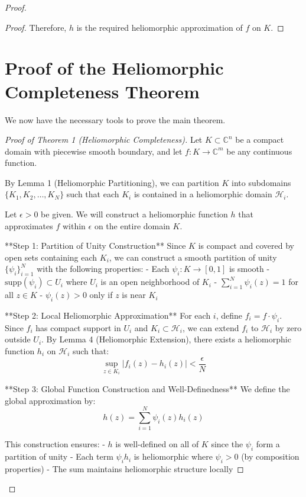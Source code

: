 \begin{proof}
\begin{proof}
Therefore, $h$ is the required heliomorphic approximation of $f$ on $K$.
\end{proof}

\section{Proof of the Heliomorphic Completeness Theorem}

We now have the necessary tools to prove the main theorem.

\begin{proof}[Proof of Theorem 1 (Heliomorphic Completeness)]
Let $K \subset \mathbb{C}^n$ be a compact domain with piecewise smooth boundary, and let $f: K \rightarrow \mathbb{C}^m$ be any continuous function.

By Lemma 1 (Heliomorphic Partitioning), we can partition $K$ into subdomains $\{K_1, K_2, \ldots, K_N\}$ such that each $K_i$ is contained in a heliomorphic domain $\mathcal{H}_i$.

Let $\epsilon > 0$ be given. We will construct a heliomorphic function $h$ that approximates $f$ within $\epsilon$ on the entire domain $K$.

**Step 1: Partition of Unity Construction**
Since $K$ is compact and covered by open sets containing each $K_i$, we can construct a smooth partition of unity $\{\psi_i\}_{i=1}^{N}$ with the following properties:
- Each $\psi_i: K \rightarrow [0,1]$ is smooth
- $\text{supp}(\psi_i) \subset U_i$ where $U_i$ is an open neighborhood of $K_i$
- $\sum_{i=1}^{N} \psi_i(z) = 1$ for all $z \in K$
- $\psi_i(z) > 0$ only if $z$ is near $K_i$

**Step 2: Local Heliomorphic Approximation**
For each $i$, define $f_i = f \cdot \psi_i$. Since $f_i$ has compact support in $U_i$ and $K_i \subset \mathcal{H}_i$, we can extend $f_i$ to $\mathcal{H}_i$ by zero outside $U_i$. By Lemma 4 (Heliomorphic Extension), there exists a heliomorphic function $h_i$ on $\mathcal{H}_i$ such that:
\begin{equation}
\sup_{z \in K_i} |f_i(z) - h_i(z)| < \frac{\epsilon}{N}
\end{equation}

**Step 3: Global Function Construction and Well-Definedness**
We define the global approximation by:
$$h(z) = \sum_{i=1}^{N} \psi_i(z) h_i(z)$$

This construction ensures:
- $h$ is well-defined on all of $K$ since the $\psi_i$ form a partition of unity
- Each term $\psi_i h_i$ is heliomorphic where $\psi_i > 0$ (by composition properties)
- The sum maintains heliomorphic structure locally


\end{proof}
\end{proof}
